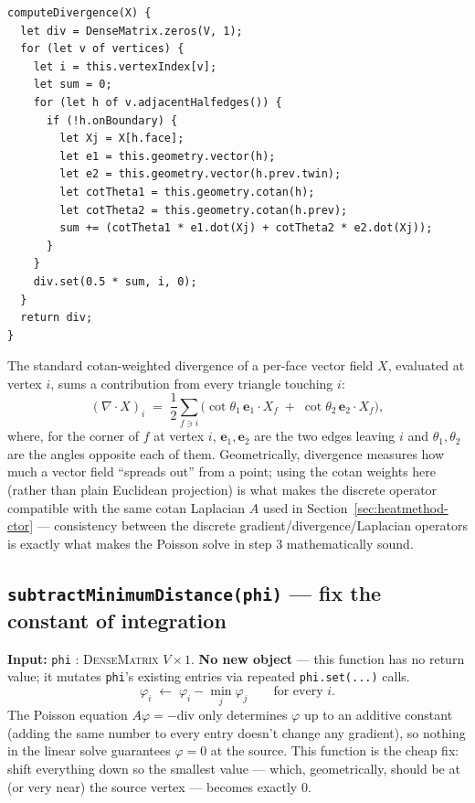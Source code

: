 \documentclass[11pt]{article}
\newcommand{\code}[1]{\texttt{#1}}
\newcommand{\func}[1]{\texttt{\textbf{#1}}}
\newcommand{\type}[1]{\textsc{#1}}
\begin{document}
\begin{lstlisting}
computeDivergence(X) {
  let div = DenseMatrix.zeros(V, 1);
  for (let v of vertices) {
    let i = this.vertexIndex[v];
    let sum = 0;
    for (let h of v.adjacentHalfedges()) {
      if (!h.onBoundary) {
        let Xj = X[h.face];
        let e1 = this.geometry.vector(h);
        let e2 = this.geometry.vector(h.prev.twin);
        let cotTheta1 = this.geometry.cotan(h);
        let cotTheta2 = this.geometry.cotan(h.prev);
        sum += (cotTheta1 * e1.dot(Xj) + cotTheta2 * e2.dot(Xj));
      }
    }
    div.set(0.5 * sum, i, 0);
  }
  return div;
}
\end{lstlisting}

The standard cotan-weighted divergence of a per-face vector field $X$, evaluated at vertex
$i$, sums a contribution from every triangle touching $i$:
\[
  (\nabla\!\cdot\!X)_i \;=\; \frac12 \sum_{f \ni i}
      \Big(\cot\theta_1\, \mathbf{e}_1\!\cdot\! X_f \;+\; \cot\theta_2\, \mathbf{e}_2\!\cdot\! X_f\Big),
\]
where, for the corner of $f$ at vertex $i$, $\mathbf{e}_1,\mathbf{e}_2$ are the two edges
leaving $i$ and $\theta_1,\theta_2$ are the angles opposite each of them. Geometrically,
divergence measures how much a vector field ``spreads out'' from a point; using the cotan
weights here (rather than plain Euclidean projection) is what makes the discrete operator
compatible with the same cotan Laplacian $A$ used in Section~\ref{sec:heatmethod-ctor} ---
consistency between the discrete gradient/divergence/Laplacian operators is exactly what
makes the Poisson solve in step 3 mathematically sound.

\subsection{\func{subtractMinimumDistance(phi)} --- fix the constant of integration}
\label{sec:submin}
\textbf{Input:} \code{phi} : \type{DenseMatrix} $V\times1$. \textbf{No new object} --- this
function has no return value; it mutates \code{phi}'s existing entries via repeated
\code{phi.set(...)} calls.
\[
  \varphi_i \;\longleftarrow\; \varphi_i - \min_{j} \varphi_j \qquad \text{for every } i.
\]
The Poisson equation $A\varphi=-\mathrm{div}$ only determines $\varphi$ up to an additive
constant (adding the same number to every entry doesn't change any gradient), so nothing in
the linear solve guarantees $\varphi=0$ at the source. This function is the cheap fix:
shift everything down so the smallest value --- which, geometrically, should be at (or very
near) the source vertex --- becomes exactly $0$.
\end{document}
